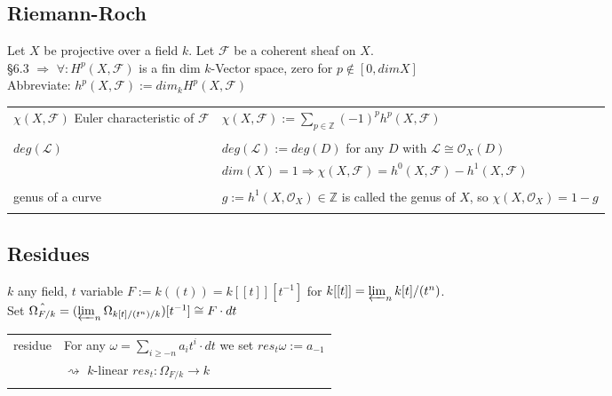 \documentclass[a4paper, 12pt]{article}
\newcommand{\ca}[1]{\mathcal{#1}}
\newcommand{\caf}{\mathcal{F}}
\newcommand{\ox}{\mathcal{O}_X}
\begin{document}
\subsection{Riemann-Roch}



Let $X$ be projective over a field $k$. Let $\caf$ be a coherent sheaf on $X$.\\
§6.3 $\Rightarrow$ $\forall : H^p(X ,\caf )$ is a fin dim $k$-Vector space, zero for $p \notin [0, dimX]$\\
Abbreviate: $h^p(X, \caf ) := dim_k H^p(X, \caf)$\\

\begin{longtable}{p{}  p{} }

$\chi(X , \caf ) $ Euler characteristic of $\caf$ & $\chi(X,\caf) := \sum_{p \in \mathbb{Z}} (-1)^p h^p(X, \caf )$\\

&\\

$deg(\ca{L})$ & $deg(\ca{L}):= deg(D)$ for any $D$ with $\ca{L} \cong \ox(D)$\\
& $dim(X)=1\Rightarrow \chi(X, \caf) = h^0(X,\caf) - h^1(X, \caf)$\\

&\\

genus of a curve & $g:= h^1(X, \ox) \in \mathbb{Z}$ is called the genus of $X$,  so $\chi(X, \ox)= 1 - g$\\

&\\
  
\end{longtable}


\subsection{Residues}

$k$ any field, $t$ variable $F:=k((t))=k[[t]][t^{-1}]$ for $k[[t]] = \varprojlim_{n} k[t]/(t^n)$.\\

Set $\hat{\Omega_{F/k}} = (\varprojlim_{n} \Omega_{k[t]/(t^n)/k})[t^{-1}] \cong F\cdot dt$\\


\begin{longtable}{p{}  p{} }
	residue & For any $\omega = \sum_{i \geq -n} a_i t^i \cdot dt$ we set $res_t\omega := a_{-1}$\\
	& $\rightsquigarrow$ $k$-linear $res_t : \Omega_{F/k} \longrightarrow k$\\
	
	&\\
	
	
\end{longtable}
\end{document}
